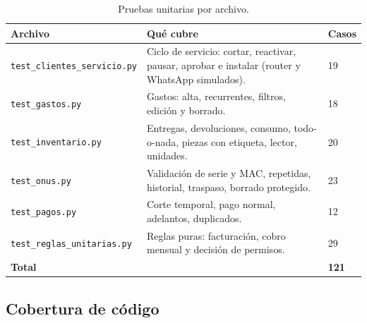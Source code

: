 \begin{table}[H]
\centering
\caption{Pruebas unitarias por archivo.}
\label{tab:ce02-e4-unitarias}
\small
\begin{tabularx}{\textwidth}{L{4.6cm}XC{1.2cm}}
\toprule
\textbf{Archivo} & \textbf{Qué cubre} & \textbf{Casos} \\
\midrule
\texttt{test\_clientes\_servicio.py} & Ciclo de servicio: cortar, reactivar, pausar, aprobar e instalar (router y WhatsApp simulados). & 19 \\
\texttt{test\_gastos.py} & Gastos: alta, recurrentes, filtros, edición y borrado. & 18 \\
\texttt{test\_inventario.py} & Entregas, devoluciones, consumo, todo-o-nada, piezas con etiqueta, lector, unidades. & 20 \\
\texttt{test\_onus.py} & Validación de serie y MAC, repetidas, historial, traspaso, borrado protegido. & 23 \\
\texttt{test\_pagos.py} & Corte temporal, pago normal, adelantos, duplicados. & 12 \\
\texttt{test\_reglas\_unitarias.py} & Reglas puras: facturación, cobro mensual y decisión de permisos. & 29 \\
\midrule
\textbf{Total} & & \textbf{121} \\
\bottomrule
\end{tabularx}
\end{table}

\subsection{Cobertura de código}

